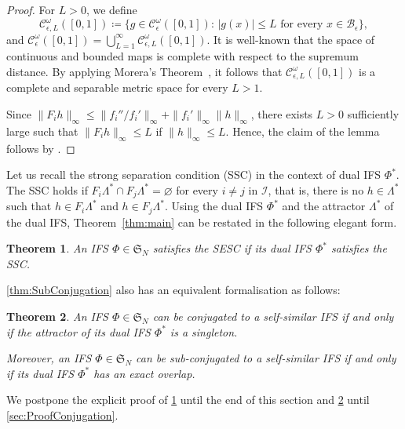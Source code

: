 \documentclass[11pt,]{article}
\def\cref#1{\ref{#1}}%
\newtheorem{theorem}{Theorem}[section]
\theoremstyle{definition}
\theoremstyle{remark}
\newcommand{\0}{\mathbf{0}}
\begin{document}
\begin{proof}
For $L>0$, we define 
$$
\mathcal{C}_{\epsilon,L}^{\omega}([0,1])\coloneqq \big\{g\in\mathcal{C}_\epsilon^{\omega}([0,1]):\,
|g(x)|\leq L\text{ for every }x\in\mathcal{B}_\epsilon\big\},
$$
and
$\mathcal{C}_{\epsilon}^{\omega}([0,1])=\bigcup_{L=1}^\infty\mathcal{C}_{\epsilon,L}^{\omega}([0,1])$.
It is well-known that the space of continuous and bounded maps is complete with respect to the
supremum distance. By applying Morera's Theorem~\cite[Theorem 10.17]{Rudin_AnalysisBook}, it follows
that $\mathcal{C}_{\epsilon,L}^{\omega}([0,1])$ is a complete and separable metric space for every
$L>1$.	
	
Since $\|F_ih\|_\infty\leq\|f_i'' / f_i'\|_\infty+\|f_i'\|_\infty\|h\|_\infty$, there exists $L>0$
sufficiently large such that $\|F_ih\|_\infty\leq L$ if $\|h\|_\infty\leq L$. Hence, the claim of
the lemma follows by \cite{Hutchinson_Attractor_81}.
\end{proof}
Let us recall the strong separation condition (SSC) in the context of dual IFS $\Phi^*$. The SSC
holds if $F_i\Lambda^*\cap F_j\Lambda^*=\varnothing$ for every $i\neq j$ in $\mathcal{I}$, that is,
there is no $h\in\Lambda^*$ such that $h\in F_i\Lambda^*$ and $h\in F_j\Lambda^*$.
Using the dual IFS $\Phi^*$ and the attractor $\Lambda^*$ of the dual IFS, Theorem~\ref{thm:main}
can be restated in the following elegant form.
\begin{theorem}\label{thm:DualSSC}
	An IFS $\Phi\in\mathfrak{S}_N$ satisfies the SESC if its dual IFS $\Phi^*$ satisfies the SSC.
\end{theorem}

\cref{thm:SubConjugation} also has an equivalent formalisation as follows:

\begin{theorem}\label{thm:DualConj}
	An IFS $\Phi\in\mathfrak{S}_N$ can be conjugated to a self-similar IFS if and only if the
	attractor of its dual IFS $\Phi^*$ is a singleton. 
	
	Moreover, an IFS $\Phi\in\mathfrak{S}_N$ can be sub-conjugated to a self-similar IFS if and
	only if its dual IFS $\Phi^*$ has an exact overlap.
\end{theorem}

We postpone the explicit proof of \cref{thm:DualSSC} until the end of this section and
\cref{thm:DualConj} until \cref{sec:ProofConjugation}.
\end{document}
